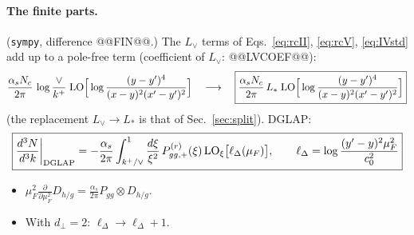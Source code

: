 \documentclass[10pt]{article}
\numberwithin{equation}{section}
\newcommand{\Lv}{L_{\vee}}
\newcommand{\Ls}{L_{*}}
\newcommand{\LOx}[1]{{\rm LO}_\xi\big[#1\big]}
\begin{document}
\paragraph{The finite parts.} (\texttt{sympy}, difference @@FIN@@.) The $\Lv$ terms of Eqs.~\eqref{eq:rcII}, \eqref{eq:rcV}, \eqref{eq:IVstd} add up to a pole-free term (coefficient of $\Lv$: @@LVCOEF@@):
\begin{equation}
\frac{\alpha_sN_c}{2\pi}\,\log\frac{\vee}{k^+}\;{\rm LO}\Big[\log\frac{(y-y')^4}{(x-y)^2(x'-y')^2}\Big]\quad\longrightarrow\quad\boxed{\frac{\alpha_sN_c}{2\pi}\,\Ls\;{\rm LO}\Big[\log\frac{(y-y')^4}{(x-y)^2(x'-y')^2}\Big]}
\label{eq:LvE}
\end{equation}
(the replacement $\Lv\to\Ls$ is that of Sec.~\ref{sec:split}). DGLAP:
\begin{equation}
\boxed{\frac{d^3N}{d^3k}\bigg|_{\rm DGLAP}=-\frac{\alpha_s}{2\pi}\int_{k^+/\vee}^1\frac{d\xi}{\xi^2}\,P^{(r)}_{gg,+}(\xi)\,\LOx{\ell_\Delta(\mu_F)},\qquad\ell_\Delta=\log\frac{(y'-y)^2\mu_F^2}{c_0^2}}
\label{eq:dglap}
\end{equation}
\begin{itemize}
\item $\mu_F^2\frac{\partial}{\partial\mu_F^2}D_{h/g}=\frac{\alpha_s}{2\pi}P_{gg}\otimes D_{h/g}$.
\item With $d_\perp=2$: $\ell_\Delta\to\ell_\Delta+1$.
\end{itemize}
\end{document}
